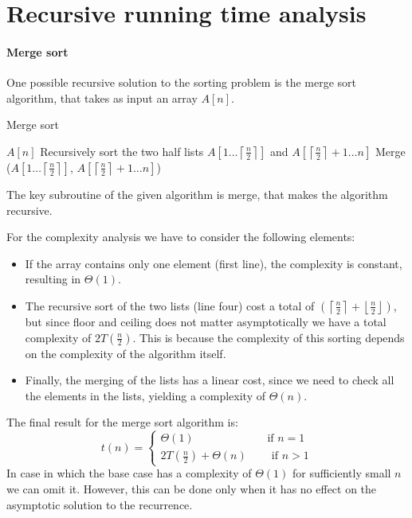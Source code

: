 \section{Recursive running time analysis}

\paragraph*{Merge sort}
One possible recursive solution to the sorting problem is the merge sort algorithm, that takes as input an array $A[n]$.  
\begin{algorithm}[H]
    \caption{Merge sort}
        \begin{algorithmic}[1]
                \State\Return $A[n]$
            \EndIf
            \State Recursively sort the two half lists $A\left[1\ldots\left\lceil \frac{n}{2}\right\rceil \right]$ and $A\left[\left\lceil \frac{n}{2}\right\rceil + 1 \ldots n\right]$
            \State Merge ($A\left[1\ldots\left\lceil \frac{n}{2}\right\rceil \right]$, $A\left[\left\lceil \frac{n}{2}\right\rceil + 1 \ldots n\right]$)
        \end{algorithmic}
\end{algorithm}
The key subroutine of the given algorithm is merge, that makes the algorithm recursive. 

For the complexity analysis we have to consider the following elements: 
\begin{itemize}
    \item If the array contains only one element (first line), the complexity is constant, resulting in $\Theta(1)$. 
    \item The recursive sort of the two lists (line four) cost a total of $(\left\lceil \frac{n}{2} \right\rceil+\left\lfloor \frac{n}{2} \right\rfloor )$, but since floor and ceiling does not matter asymptotically we have a total complexity of $2T\left(\frac{n}{2}\right)$. 
        This is because the complexity of this sorting depends on the complexity of the algorithm itself. 
    \item Finally, the merging of the lists has a linear cost, since we need to check all the elements in the lists, yielding a complexity of $\Theta(n)$. 
\end{itemize}
The final result for the merge sort algorithm is: 
\[t(n)=\begin{cases}
    \Theta(1)\qquad\qquad\qquad\: \text{ if }n=1 \\
    2T\left(\frac{n}{2}\right) + \Theta(n)\qquad\:\text{if }n>1
\end{cases}\]
In case in which the base case has a complexity of $\Theta(1)$ for sufficiently small $n$ we can omit it. 
However, this can be done only when it has no effect on the asymptotic solution to the recurrence. 

